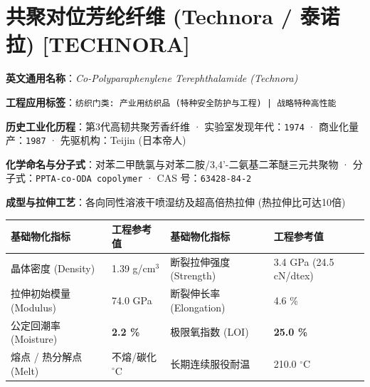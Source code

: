 \documentclass[11pt,openright,twoside,UTF8]{ctexbook}
\begin{document}
\section{共聚对位芳纶纤维 (Technora / 泰诺拉) [TECHNORA]}
\label{sec:technora}

\noindent\textbf{英文通用名称}：\textit{Co-Polyparaphenylene Terephthalamide (Technora)}\par
\noindent\textbf{工程应用标签}：\texttt{纺织门类: 产业用纺织品 (特种安全防护与工程) | 战略特种高性能}\par
\noindent\textbf{历史工业化历程}：第3代高韧共聚芳香纤维 · 实验室发现年代：\texttt{1974} · 商业化量产：\texttt{1987} · 先驱机构：Teijin (日本帝人)\par
\noindent\textbf{化学命名与分子式}：对苯二甲酰氯与对苯二胺/3,4'-二氨基二苯醚三元共聚物 · 分子式：\texttt{PPTA-co-ODA copolymer} · CAS 号：\texttt{63428-84-2}\par
\noindent\textbf{成型与拉伸工艺}：各向同性溶液干喷湿纺及超高倍热拉伸 (热拉伸比可达10倍)\par

\vspace{0.15cm}
\begin{center}
\small
\begin{tabularx}{\textwidth}{p{3.8cm}Xp{3.8cm}X}
\toprule
\textbf{基础物化指标} & \textbf{工程参考值} & \textbf{基础物化指标} & \textbf{工程参考值} \\
\midrule
晶体密度 (Density) & 1.39 g/cm$^3$ & 断裂拉伸强度 (Strength) & 3.4 GPa (24.5 cN/dtex) \\
拉伸初始模量 (Modulus) & 74.0 GPa & 断裂伸长率 (Elongation) & 4.6 \% \\
公定回潮率 (Moisture) & \textbf{2.2 \%} & 极限氧指数 (LOI) & \textbf{25.0 \%} \\
熔点 / 热分解点 (Melt) & 不熔/碳化 $^\circ\mathrm{C}$ & 长期连续服役耐温 & 210.0 $^\circ\mathrm{C}$ \\
\bottomrule
\end{tabularx}
\end{center}
\vspace{0.15cm}
\end{document}

